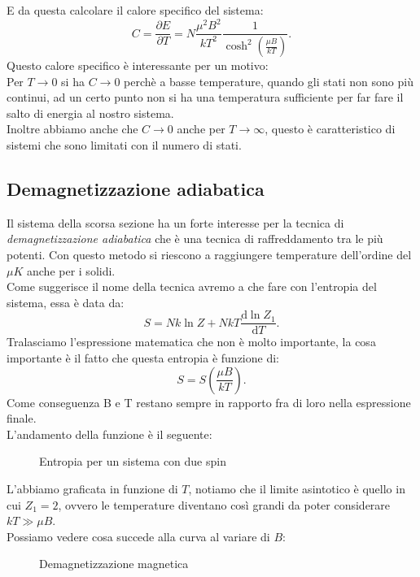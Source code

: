 E da questa calcolare il calore specifico del sistema:
\[
	C = \frac{\partial E}{\partial T} = N \frac{\mu^2B^2}{kT^2} \frac{1}{\cosh^2\left( \frac{\mu B}{kT} \right) }
.\] 
Questo calore specifico è interessante per un motivo:\\
Per $T \rightarrow 0$ si ha $C \rightarrow 0$ perchè a basse temperature, quando gli stati non sono più continui, ad un certo punto non si ha una temperatura sufficiente per far fare il salto di energia al nostro sistema.\\
Inoltre abbiamo anche che $C \rightarrow 0 $ anche per $ T \rightarrow \infty$, questo è caratteristico di sistemi che sono limitati con il numero di stati. \\

\subsection{Demagnetizzazione adiabatica}%
Il sistema della scorsa sezione ha un forte interesse per la tecnica di \textit{demagnetizzazione adiabatica} che è una tecnica di raffreddamento tra le più potenti.
Con questo metodo si riescono a raggiungere temperature dell'ordine del $\mu K$ anche per i solidi. \\
Come suggerisce il nome della tecnica avremo a che fare con l'entropia del sistema, essa è data da:
 \[
	S = Nk \ln Z + NkT \frac{\mbox{d} \ln Z_{1}}{\mbox{d} T} 
.\] 
Tralasciamo l'espressione matematica che non è molto importante, la cosa importante è il fatto che questa entropia è funzione di: 
\[
    S = S\left(\frac{\mu B}{kT}\right)
.\] 
Come conseguenza B e T restano sempre in rapporto fra di loro nella espressione finale.\\
L'andamento della funzione è il seguente:
\begin{figure}[H]
    \centering
    \caption{Entropia per un sistema con due spin}
    \label{fig:entropia-per-sistema-con-due-spin}
\end{figure}
\noindent
L'abbiamo graficata in funzione di $T$, notiamo che il limite asintotico è quello in cui $Z_1 = 2$, ovvero le temperature diventano così grandi da poter considerare $kT \gg \mu B$. \\
Possiamo vedere cosa succede alla curva al variare di $B$:
\begin{figure}[H]
    \centering
    \caption{Demagnetizzazione magnetica}
    \label{fig:demagnetizzazione-magnetica}
\end{figure}
